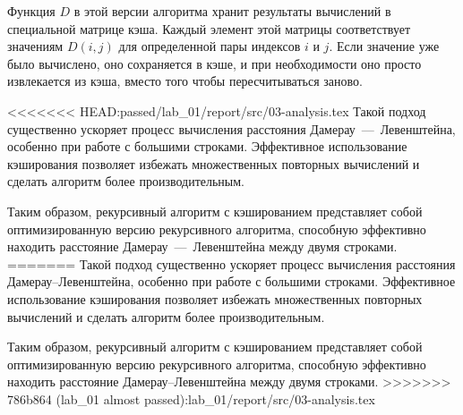 Функция $D$ в этой версии алгоритма хранит результаты вычислений в специальной матрице кэша. 
Каждый элемент этой матрицы соответствует значениям $D(i, j)$ для определенной пары индексов $i$ и $j$. 
Если значение уже было вычислено, оно сохраняется в кэше, и при необходимости оно просто извлекается из кэша, вместо того чтобы пересчитываться заново.

<<<<<<< HEAD:passed/lab_01/report/src/03-analysis.tex
Такой подход существенно ускоряет процесс вычисления расстояния Дамерау~---~Левенштейна, особенно при работе с большими строками.
Эффективное использование кэширования позволяет избежать множественных повторных вычислений и сделать алгоритм более производительным.

Таким образом, рекурсивный алгоритм с кэшированием представляет собой оптимизированную версию рекурсивного алгоритма, способную эффективно находить расстояние Дамерау~---~Левенштейна между двумя строками.
=======
Такой подход существенно ускоряет процесс вычисления расстояния Дамерау--Левенштейна, особенно при работе с большими строками.
Эффективное использование кэширования позволяет избежать множественных повторных вычислений и сделать алгоритм более производительным.

Таким образом, рекурсивный алгоритм с кэшированием представляет собой оптимизированную версию рекурсивного алгоритма, способную эффективно находить расстояние Дамерау--Левенштейна между двумя строками.
>>>>>>> 786b864 (lab_01 almost passed):lab_01/report/src/03-analysis.tex
